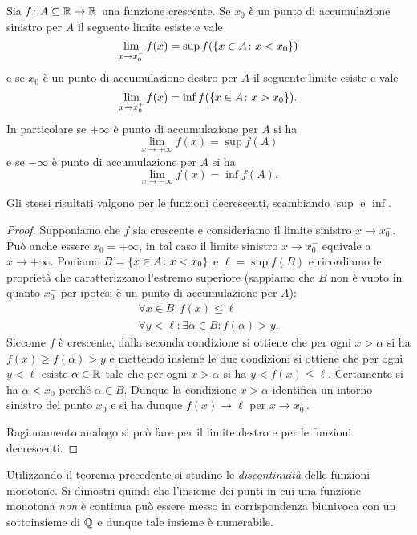 \begin{theorem}%
  \mymark{**}%
  \label{th:limite_monotona}%
Sia $f\colon A \subseteq {\mathbb R} \to {\mathbb R}$ una funzione crescente. 
Se $x_0$ è un punto di accumulazione sinistro per $A$ 
il seguente limite esiste e vale
\[
   \lim_{x\to x_0^-}f(x) = \sup f({\left\{ x\in A\colon x<x_0 \right\}})
\]
e se $x_0$ è un punto di accumulazione destro per $A$ 
il seguente limite esiste e vale
\[
   \lim_{x\to x_0^+} f(x) = \inf f({\left\{ x\in A\colon x>x_0 \right\}}).
\]
In particolare se $+\infty$ è punto di accumulazione per $A$ 
si ha 
\[
  \lim_{x\to +\infty} f(x) = \sup f(A)
\]
e se $-\infty$ è punto di accumulazione per $A$ si ha 
\[
  \lim_{x\to -\infty} f(x) = \inf f(A).
\]

Gli stessi risultati valgono per le funzioni decrescenti, 
scambiando $\sup$ e $\inf$.
\end{theorem}
%
\begin{proof}\mymark{**}
Supponiamo che $f$ sia crescente e consideriamo il limite 
sinistro $x\to x_0^-$. Può anche essere $x_0=+\infty$, in tal 
caso il limite sinistro $x\to x_0^-$ equivale a $x\to +\infty$.
Poniamo $B={\left\{ x\in A\colon x<x_0 \right\}}$
e $\ell=\sup f(B)$ e ricordiamo le proprietà che caratterizzano 
l'estremo superiore
(sappiamo che $B$ non è vuoto in quanto $x_0^-$ per ipotesi 
è un punto di accumulazione per $A$):
\begin{gather*}
  \forall x \in B \colon f(x) \le \ell \\
  \forall y < \ell \colon \exists \alpha \in B \colon f(\alpha) > y.
\end{gather*}
Siccome $f$ è crescente, dalla seconda condizione 
si ottiene che per ogni $x>\alpha$ si ha $f(x)\ge f(\alpha)> y$
e mettendo insieme le due condizioni si ottiene che per ogni $y<\ell$
esiste $\alpha\in{\mathbb R}$ tale che per ogni $x>\alpha$ si ha $y<f(x)\le \ell$.
Certamente si ha $\alpha < x_0$ perché $\alpha\in B$.   
Dunque la condizione $x>\alpha$ identifica un intorno sinistro 
del punto $x_0$ e si ha dunque $f(x)\to \ell$ per $x\to x_0^-$.

Ragionamento analogo si può fare per il limite destro  
e per le funzioni decrescenti.
\end{proof}

\begin{exercise}
  Utilizzando il teorema precedente si studino le \emph{discontinuità}
  delle funzioni monotone. 
  Si dimostri quindi che l'insieme dei punti in cui una funzione monotona 
  \emph{non} è continua può essere messo in corrispondenza biunivoca 
  con un sottoinsieme di ${\mathbb Q}$ e dunque tale insieme è numerabile.
\end{exercise}

